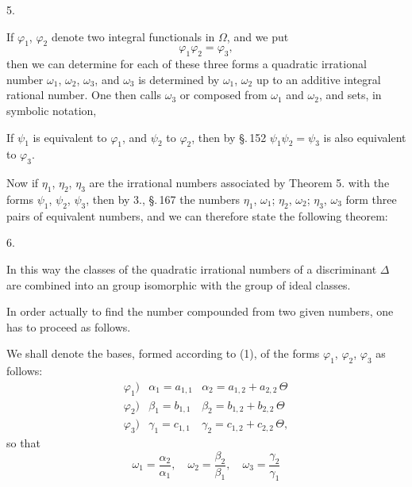 
5. 

If $\varphi_1$, $\varphi_2$ denote two integral functionals in $\Omega$, and we put
\[
\varphi_1 \varphi_2 = \varphi_3,
\]
then we can determine for each of these three forms a quadratic irrational number $\omega_1$, $\omega_2$, $\omega_3$, and $\omega_3$ is determined by $\omega_1$, $\omega_2$ up to an additive integral rational number. One then calls $\omega_3$  or composed from $\omega_1$ and $\omega_2$, and sets, in symbolic notation,

If $\psi_1$ is equivalent to $\varphi_1$, and $\psi_2$ to $\varphi_2$, then by \S.\,152 $\psi_1 \psi_2 = \psi_3$ is also equivalent to $\varphi_3$.

Now if $\eta_1$, $\eta_2$, $\eta_3$ are the irrational numbers associated by Theorem 5. with the forms $\psi_1$, $\psi_2$, $\psi_3$, then by 3., \S.\,167 the numbers $\eta_1$, $\omega_1$; $\eta_2$, $\omega_2$; $\eta_3$, $\omega_3$ form three pairs of equivalent numbers, and we can therefore state the following theorem:

6. 

In this way the classes of the quadratic irrational numbers of a discriminant $\Delta$ are combined into an  group isomorphic with the group of ideal classes.

In order actually to find the number compounded from two given numbers, one has to proceed as follows.

We shall denote the bases, formed according to (1), of the forms $\varphi_1$, $\varphi_2$, $\varphi_3$ as follows:
\[
\begin{array}{lll}
\varphi_1) & \alpha_1 = a_{1,1} & \alpha_2 = a_{1,2} + a_{2,2}\,\Theta \\
\varphi_2) & \beta_1 = b_{1,1} & \beta_2 = b_{1,2} + b_{2,2}\,\Theta \\
\varphi_3) & \gamma_1 = c_{1,1} & \gamma_2 = c_{1,2} + c_{2,2}\,\Theta,
\end{array}
\]
so that
\[
\omega_1 = \frac{\alpha_2}{\alpha_1}, \quad \omega_2 = \frac{\beta_2}{\beta_1}, \quad \omega_3 = \frac{\gamma_2}{\gamma_1}
\]
